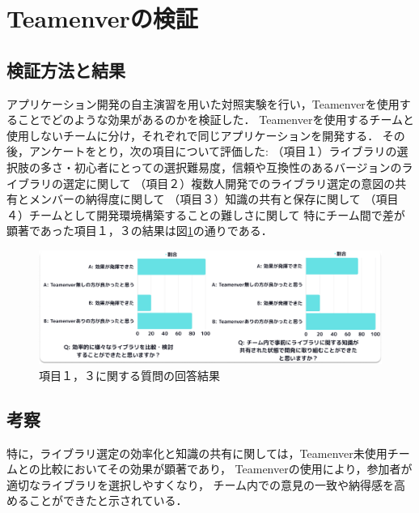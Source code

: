 \documentclass[main]{subfiles}
\begin{document}
\section{Teamenverの検証}
\subsection{検証方法と結果}
アプリケーション開発の自主演習を用いた対照実験を行い，Teamenverを使用することでどのような効果があるのかを検証した．
Teamenverを使用するチームと使用しないチームに分け，それぞれで同じアプリケーションを開発する．
その後，アンケートをとり，次の項目について評価した: 
（項目１）ライブラリの選択肢の多さ・初心者にとっての選択難易度，信頼や互換性のあるバージョンのライブラリの選定に関して
（項目２）複数人開発でのライブラリ選定の意図の共有とメンバーの納得度に関して
（項目３）知識の共有と保存に関して
（項目４）チームとして開発環境構築することの難しさに関して
特にチーム間で差が顕著であった項目１，３の結果は図\ref{fig:result}の通りである．

\begin{figure}[h]
    \centering
    \includegraphics[keepaspectratio,width=1.1\linewidth]{../figures/result.pdf}
    \caption{項目１，３に関する質問の回答結果}
    \label{fig:result}
\end{figure}
\subsection{考察}
特に，ライブラリ選定の効率化と知識の共有に関しては，Teamenver未使用チームとの比較においてその効果が顕著であり，
Teamenverの使用により，参加者が適切なライブラリを選択しやすくなり，
チーム内での意見の一致や納得感を高めることができたと示されている．
\end{document}
